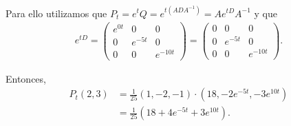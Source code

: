 Para ello utilizamos que $P_t = e^tQ = e^{t(ADA^{-1})} = Ae^{tD}A^{-1}$ y que
\begin{align}
    e^{tD}  =   
            \begin{pmatrix}
                e^{0 t} &   0           &   0      \\
                0       &   e^{-5 t}    &   0      \\
                0       &   0           &   e^{-10 t}
            \end{pmatrix}
            =   
            \begin{pmatrix}
                0       &   0           &   0      \\
                0       &   e^{-5 t}    &   0      \\
                0       &   0           &   e^{-10 t}
            \end{pmatrix}.
\end{align}\pn

Entonces, 
\begin{align}
        P_t(2,3) &= \frac{1}{25} (1,-2,-1) \cdot (18, -2e^{-5t}, -3e^{10t})                                                                                 \\
                 &= \frac{1}{25} (18 + 4e^{-5t} + 3e^{10t}).                                                                                                \\
\end{align}

